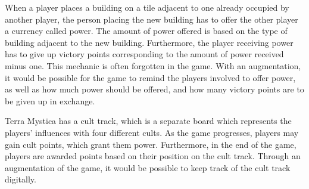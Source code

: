 When a player places a building on a tile adjacent to one already occupied by another player, the person placing the new building has to offer the other player a currency called power. The amount of power offered is based on the type of building adjacent to the new building. Furthermore, the player receiving power has to give up victory points corresponding to the amount of power received minus one. This mechanic is often forgotten in the game. With an augmentation, it would be possible for the game to remind the players involved to offer power, as well as how much power should be offered, and how many victory points are to be given up in exchange.

Terra Mystica has a cult track, which is a separate board which represents the players' influences with four different cults. As the game progresses, players may gain cult points, which grant them power. Furthermore, in the end of the game, players are awarded points based on their position on the cult track. Through an augmentation of the game, it would be possible to keep track of the cult track digitally.
